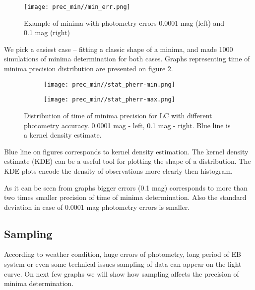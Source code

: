 \begin{figure}[!h]
    \centering
    \texttt{[image: prec\_min//min\_err.png]}
    \caption{Example of minima with photometry errors 0.0001 mag (left) and 0.1 mag (right)}
    \label{fig:min_err}
\end{figure}

We pick a easiest case -- fitting a classic shape of a minima, and made 1000 simulations of minima determination for both cases. Graphs representing time of minima precision distribution are presented on figure \ref{fig:ph_err_diag}.       

\begin{figure}[!h]
    \centering
    \begin{subfigure}[t]{0.5\textwidth}
        \centering
        \texttt{[image: prec\_min//stat\_pherr-min.png]}
    \end{subfigure}%
    \begin{subfigure}[t]{0.5\textwidth}
        \centering
        \texttt{[image: prec\_min//stat\_pherr-max.png]}
    \end{subfigure}
    \caption{Distribution of time of minima precision for LC with different photometry accuracy. 0.0001 mag - left, 0.1 mag - right. Blue line is a kernel density estimate.}
\label{fig:ph_err_diag}
\end{figure}
Blue line on figures corresponds to kernel density estimation.
The kernel density estimate (KDE) can be a useful tool for plotting the shape of a distribution. The KDE plots encode the density of observations more clearly then histogram.

As it can be seen from graphs bigger errors (0.1 mag) corresponds to more than two times smaller precision of time of minima determination. Also the standard deviation in case of 0.0001 mag photometry errors is smaller.   

\subsection{Sampling}
According to weather condition, huge errors of photometry, long period of EB system or even some technical issues sampling of data can appear on the light curve.
On next few graphs we will show how sampling affects the precision of minima determination.

